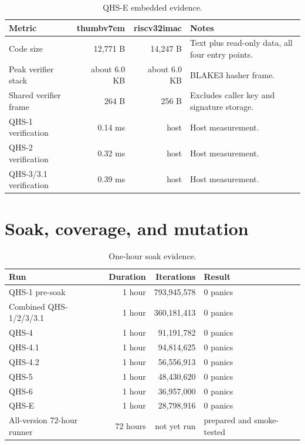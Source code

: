 \documentclass[11pt,a4paper]{article}
\theoremstyle{remark}
\begin{document}
\begin{table}[ht]
\centering
\caption{QHS-E embedded evidence.}
\label{tab:embedded}
\small
\begin{tabularx}{\textwidth}{@{}l r r X@{}}
\toprule
Metric & thumbv7em & riscv32imac & Notes\\
\midrule
Code size & 12,771 B & 14,247 B & Text plus read-only data, all four entry points.\\
Peak verifier stack & about 6.0 KB & about 6.0 KB & BLAKE3 hasher frame.\\
Shared verifier frame & 264 B & 256 B & Excludes caller key and signature storage.\\
QHS-1 verification & 0.14 ms & host & Host measurement.\\
QHS-2 verification & 0.32 ms & host & Host measurement.\\
QHS-3/3.1 verification & 0.39 ms & host & Host measurement.\\
\bottomrule
\end{tabularx}
\end{table}

\section{Soak, coverage, and mutation}

\begin{table}[ht]
\centering
\caption{One-hour soak evidence.}
\label{tab:soak}
\small
\begin{tabularx}{\textwidth}{@{}l r r X@{}}
\toprule
Run & Duration & Iterations & Result\\
\midrule
QHS-1 pre-soak & 1 hour & 793,945,578 & 0 panics\\
Combined QHS-1/2/3/3.1 & 1 hour & 360,181,413 & 0 panics\\
QHS-4 & 1 hour & 91,191,782 & 0 panics\\
QHS-4.1 & 1 hour & 94,814,625 & 0 panics\\
QHS-4.2 & 1 hour & 56,556,913 & 0 panics\\
QHS-5 & 1 hour & 48,430,620 & 0 panics\\
QHS-6 & 1 hour & 36,957,000 & 0 panics\\
QHS-E & 1 hour & 28,798,916 & 0 panics\\
All-version 72-hour runner & 72 hours & not yet run & prepared and smoke-tested\\
\bottomrule
\end{tabularx}
\end{table}
\end{document}
